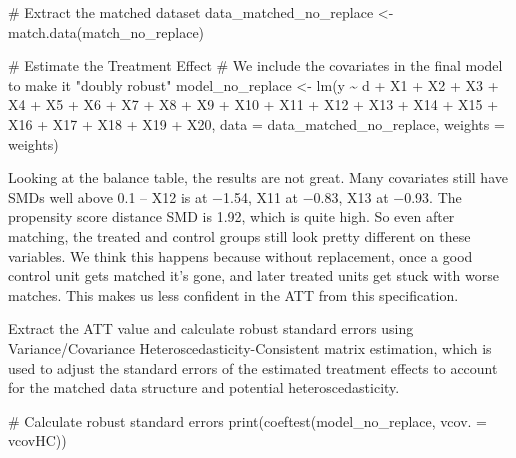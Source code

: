 \documentclass[
  letterpaper,
  DIV=11,
  numbers=noendperiod]{scrartcl}
\newenvironment{Shaded}{\begin{snugshade}}{\end{snugshade}}
\newcommand{\AttributeTok}[1]{\textcolor[rgb]{0.40,0.45,0.13}{#1}}
\newcommand{\CommentTok}[1]{\textcolor[rgb]{0.37,0.37,0.37}{#1}}
\newcommand{\FunctionTok}[1]{\textcolor[rgb]{0.28,0.35,0.67}{#1}}
\newcommand{\NormalTok}[1]{\textcolor[rgb]{0.00,0.23,0.31}{#1}}
\newcommand{\OtherTok}[1]{\textcolor[rgb]{0.00,0.23,0.31}{#1}}
\newcommand{\SpecialCharTok}[1]{\textcolor[rgb]{0.37,0.37,0.37}{#1}}
\begin{document}
\begin{Shaded}
\begin{Highlighting}[]
\CommentTok{\# Extract the matched dataset}
\NormalTok{data\_matched\_no\_replace }\OtherTok{\textless{}{-}} \FunctionTok{match.data}\NormalTok{(match\_no\_replace)}

\CommentTok{\# Estimate the Treatment Effect}
\CommentTok{\# We include the covariates in the final model to make it "doubly robust"}
\NormalTok{model\_no\_replace }\OtherTok{\textless{}{-}} \FunctionTok{lm}\NormalTok{(y }\SpecialCharTok{\textasciitilde{}}\NormalTok{ d }\SpecialCharTok{+}\NormalTok{ X1 }\SpecialCharTok{+}\NormalTok{ X2 }\SpecialCharTok{+}\NormalTok{ X3 }\SpecialCharTok{+}\NormalTok{ X4 }\SpecialCharTok{+}\NormalTok{ X5 }\SpecialCharTok{+}\NormalTok{ X6 }\SpecialCharTok{+}\NormalTok{ X7 }\SpecialCharTok{+}\NormalTok{ X8 }\SpecialCharTok{+}\NormalTok{ X9 }\SpecialCharTok{+} 
\NormalTok{                       X10 }\SpecialCharTok{+}\NormalTok{ X11 }\SpecialCharTok{+}\NormalTok{ X12 }\SpecialCharTok{+}\NormalTok{ X13 }\SpecialCharTok{+}\NormalTok{ X14 }\SpecialCharTok{+}\NormalTok{ X15 }\SpecialCharTok{+}\NormalTok{ X16 }\SpecialCharTok{+}\NormalTok{ X17 }\SpecialCharTok{+}\NormalTok{ X18 }\SpecialCharTok{+}
\NormalTok{                       X19 }\SpecialCharTok{+}\NormalTok{ X20, }
                       \AttributeTok{data =}\NormalTok{ data\_matched\_no\_replace, }
                       \AttributeTok{weights =}\NormalTok{ weights)}
\end{Highlighting}
\end{Shaded}

Looking at the balance table, the results are not great. Many covariates
still have SMDs well above 0.1 -- X12 is at −1.54, X11 at −0.83, X13 at
−0.93. The propensity score distance SMD is 1.92, which is quite high.
So even after matching, the treated and control groups still look pretty
different on these variables. We think this happens because without
replacement, once a good control unit gets matched it's gone, and later
treated units get stuck with worse matches. This makes us less confident
in the ATT from this specification.

Extract the ATT value and calculate robust standard errors using
Variance/Covariance Heteroscedasticity-Consistent matrix estimation,
which is used to adjust the standard errors of the estimated treatment
effects to account for the matched data structure and potential
heteroscedasticity.

\begin{Shaded}
\begin{Highlighting}[]
\CommentTok{\# Calculate robust standard errors}
\FunctionTok{print}\NormalTok{(}\FunctionTok{coeftest}\NormalTok{(model\_no\_replace, }\AttributeTok{vcov. =}\NormalTok{ vcovHC))}
\end{Highlighting}
\end{Shaded}
\end{document}
